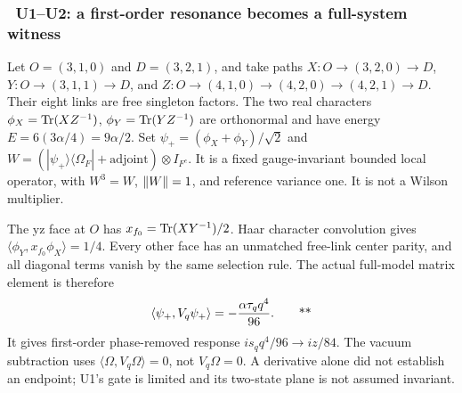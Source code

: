 \subsubsection{\workstar\ U1--U2: a first-order resonance becomes a full-system witness}

Let $O=(3,1,0)$ and $D=(3,2,1)$, and take paths
$X:O\to(3,2,0)\to D$, $Y:O\to(3,1,1)\to D$, and
$Z:O\to(4,1,0)\to(4,2,0)\to(4,2,1)\to D$.
Their eight links are free singleton factors.  The two real characters
$\phi_X=\operatorname{Tr}(XZ^{-1})$, $\phi_Y=\operatorname{Tr}(YZ^{-1})$ are orthonormal and have energy
$E=6(3\alpha/4)=9\alpha/2$.  Set
$\psi_+=(\phi_X+\phi_Y)/\sqrt2$ and
$W=(|\psi_+\rangle\langle\Omega_F|+\mathrm{adjoint})\otimes I_{F^c}$.
It is a fixed gauge-invariant bounded local operator, with $W^3=W$,
$\left\lVert W\right\rVert=1$, and reference variance one.  It is not a Wilson multiplier.

The yz face at $O$ has $x_{f_0}=\operatorname{Tr}(XY^{-1})/2$.
Haar character convolution gives
$\langle\phi_Y,x_{f_0}\phi_X\rangle=1/4$.  Every other face has an unmatched
free-link center parity, and all diagonal terms vanish by the same selection
rule.  The actual full-model matrix element is therefore
\begin{equation}
 \langle\psi_+,V_q\psi_+\rangle=-\frac{\alpha\tau_qq^4}{96}.
 \qquad\text{**}
 \label{recent:u-resonance}
\end{equation}
It gives first-order phase-removed response $is_qq^4/96\to iz/84$.
The vacuum subtraction uses $\langle\Omega,V_q\Omega\rangle=0$, not
$V_q\Omega=0$.  A derivative alone did not establish an endpoint; U1's gate is
limited and its two-state plane is not assumed invariant.


